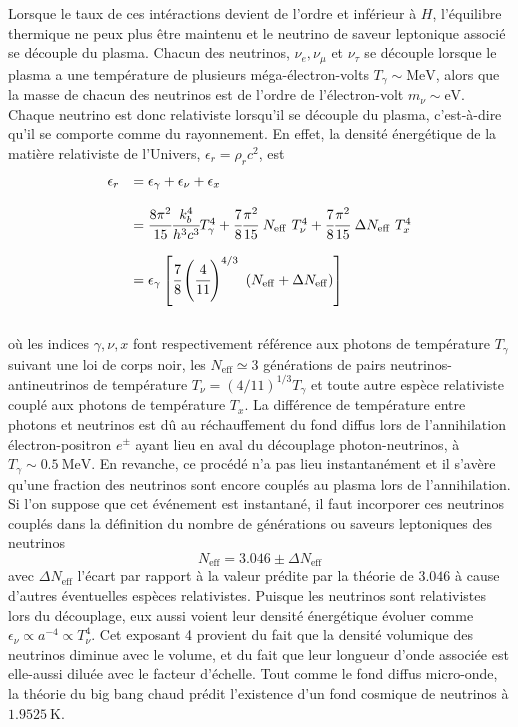 Lorsque le taux de ces intéractions devient de l'ordre et inférieur à $H$, l'équilibre thermique ne peux plus être maintenu et le neutrino de saveur leptonique associé se découple du plasma. Chacun des neutrinos, $\nu_e, \nu_\mu$ et $\nu_\tau$ se découple lorsque le plasma a une température de plusieurs méga-électron-volts $T_\gamma \sim \mathrm{MeV}$, alors que la masse de chacun des neutrinos est de l'ordre de l'électron-volt $m_\nu \sim \mathrm{eV}$. Chaque neutrino est donc relativiste lorsqu'il se découple du plasma, c'est-à-dire qu'il se comporte comme du rayonnement. En effet, la densité énergétique de la matière relativiste de l'Univers, $\epsilon_r = \rho_r c^2$, est \\
\begin{equation}
\begin{array}{cl}
\epsilon_r & = \epsilon_\gamma + \epsilon_\nu + \epsilon_x \\
\\
 & = \cfrac{8 \pi^2}{15} \cfrac{k_b^4}{h^3 c^3} T_\gamma^4 + \cfrac{7}{8} \cfrac{\pi^2}{15}~N_\mathrm{eff}~T_\nu^4 + \cfrac{7}{8} \cfrac{\pi^2}{15}~\Delta N_\mathrm{eff}~T_x^4\\
\\
 & = \epsilon_\gamma \left[ \cfrac{7}{8} \left( \cfrac{4}{11} \right)^{4/3}~\left( N_\mathrm{eff} + \Delta N_\mathrm{eff} \right) \right]
\end{array}
\end{equation} \\ où les indices $\gamma, \nu, x$ font respectivement référence aux photons de température $T_\gamma$ suivant une loi de corps noir, les $N_\mathrm{eff} \simeq 3$ générations de pairs neutrinos-antineutrinos de température $T_\nu = \left( 4/11 \right)^{1/3} T_\gamma$ et toute autre espèce relativiste couplé aux photons de température $T_x$. La différence de température entre photons et neutrinos est dû au réchauffement du fond diffus lors de l'annihilation électron-positron $e^\pm$ ayant lieu en aval du découplage photon-neutrinos, à $T_\gamma \sim 0.5~\mathrm{MeV}$. En revanche, ce procédé n'a pas lieu instantanément et il s'avère qu'une fraction des neutrinos sont encore couplés au plasma lors de l'annihilation. Si l'on suppose que cet événement est instantané, il faut incorporer ces neutrinos couplés dans la définition du nombre de générations ou saveurs leptoniques des neutrinos
\begin{equation}
N_\mathrm{eff} = 3.046 \pm \Delta N_\mathrm{eff}
\end{equation} avec $\Delta N_\mathrm{eff}$ l'écart par rapport à la valeur prédite par la théorie de $3.046$ à cause d'autres éventuelles espèces relativistes. Puisque les neutrinos sont relativistes lors du découplage, eux aussi voient leur densité énergétique évoluer comme $\epsilon_\nu \propto a^{-4} \propto T_\nu^{4}$. Cet exposant 4 provient du fait que la densité volumique des neutrinos diminue avec le volume, et du fait que leur longueur d'onde associée est elle-aussi diluée avec le facteur d'échelle. Tout comme le fond diffus micro-onde, la théorie du big bang chaud prédit l'existence d'un fond cosmique de neutrinos à $1.9525~\mathrm{K}$. \\

